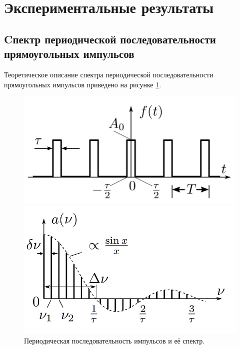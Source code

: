 \section*{Экспериментальные результаты}

\subsection*{Cпектр периодической последовательности прямоугольных импульсов}
Теоретическое описание спектра периодической последовательности прямоугольных импульсов приведено на рисунке \ref{res:impulse}.

\begin{figure}[H]
	\centering
	\begin{minipage}[b]{.49\textwidth}
		\centering
		\includegraphics[width=0.9\linewidth]{"../res/impulse"}
	\end{minipage}%
	\begin{minipage}[b]{.49\textwidth}
		\centering
		\includegraphics[width=0.9\linewidth]{"../res/impulse_spectrum"}
	\end{minipage}
	\caption{Периодическая последовательность импульсов и её спектр.}
	\label{res:impulse}
	\vspace*{-10pt}
\end{figure}

